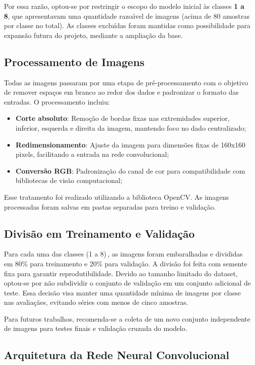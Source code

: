 Por essa razão, optou-se por restringir o escopo do modelo inicial às classes 
\textbf{1 a 8}, que apresentavam uma quantidade razoável de imagens (acima de 80 
amostras por classe no total). As classes excluídas foram mantidas como 
possibilidade para expansão futura do projeto, mediante a ampliação da base.

\subsection{Processamento de Imagens}

Todas as imagens passaram por uma etapa de pré-processamento com o objetivo de remover 
espaços em branco ao redor dos dados e padronizar o formato das entradas. O processamento incluiu:

\begin{itemize}
\item \textbf{Corte absoluto}: Remoção de bordas fixas nas extremidades superior, inferior, 
esquerda e direita da imagem, mantendo foco no dado centralizado;
\item \textbf{Redimensionamento}: Ajuste da imagem para dimensões fixas de 160x160 pixels, 
facilitando a entrada na rede convolucional;
\item \textbf{Conversão RGB}: Padronização do canal de cor para compatibilidade com bibliotecas 
de visão computacional;
\end{itemize}

Esse tratamento foi realizado utilizando a biblioteca OpenCV. As imagens processadas foram salvas 
em pastas separadas para treino e validação.
\subsection{Divisão em Treinamento e Validação}

Para cada uma das classes (1 a 8)\,, as imagens foram embaralhadas e divididas em 80\% para 
treinamento e 20\% para validação. A divisão foi feita com semente fixa para garantir 
reprodutibilidade. Devido ao tamanho limitado do dataset, optou-se por não subdividir o 
conjunto de validação em um conjunto adicional de teste. Essa decisão visa manter uma 
quantidade mínima de imagens por classe nas avaliaçães, evitando séries com menos de cinco amostras.

Para futuros trabalhos, recomenda-se a coleta de um novo conjunto independente de imagens para 
testes finais e validação cruzada do modelo.

\subsection{Arquitetura da Rede Neural Convolucional}

